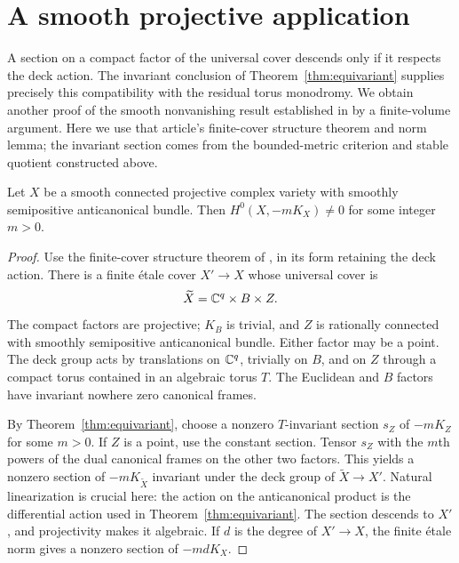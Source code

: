 \section{A smooth projective application}\label{sec:descent}

A section on a compact factor of the universal cover descends only if it respects the deck action. The invariant conclusion of Theorem~\ref{thm:equivariant} supplies precisely this compatibility with the residual torus monodromy. We obtain another proof of the smooth nonvanishing result established in \cite[Theorem ``Anticanonical nonvanishing'']{SmoothCompanion} by a finite-volume argument. Here we use that article's finite-cover structure theorem and norm lemma; the invariant section comes from the bounded-metric criterion and stable quotient constructed above.

\begin{corollary}\label{cor:smooth}
Let $X$ be a smooth connected projective complex variety with smoothly semipositive anticanonical bundle. Then $H^0(X,-mK_X)\ne0$ for some integer $m>0$.
\end{corollary}

\begin{proof}
Use the finite-cover structure theorem of \cite[Theorem ``Finite cover with compact torus monodromy'']{SmoothCompanion}, in its form retaining the deck action. There is a finite \'etale cover $X'\to X$ whose universal cover is
\[
\widetilde X=\mathbb C^q\times B\times Z.
\]
The compact factors are projective; $K_B$ is trivial, and $Z$ is rationally connected with smoothly semipositive anticanonical bundle. Either factor may be a point. The deck group acts by translations on $\mathbb C^q$, trivially on $B$, and on $Z$ through a compact torus contained in an algebraic torus $T$. The Euclidean and $B$ factors have invariant nowhere zero canonical frames.

By Theorem~\ref{thm:equivariant}, choose a nonzero $T$-invariant section $s_Z$ of $-mK_Z$ for some $m>0$. If $Z$ is a point, use the constant section. Tensor $s_Z$ with the $m$th powers of the dual canonical frames on the other two factors. This yields a nonzero section of $-mK_{\widetilde X}$ invariant under the deck group of $\widetilde X\to X'$. Natural linearization is crucial here: the action on the anticanonical product is the differential action used in Theorem~\ref{thm:equivariant}. The section descends to $X'$, and projectivity makes it algebraic. If $d$ is the degree of $X'\to X$, the finite \'etale norm \cite[Lemma ``Finite \'etale norm'']{SmoothCompanion} gives a nonzero section of $-mdK_X$.
\end{proof}

